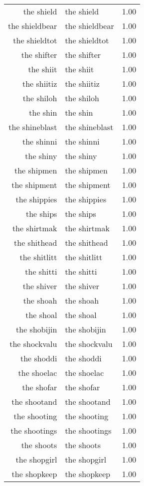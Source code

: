 \begin{table}[ht]
\begin{tabular}{rlr}
  the shield & the shield & 1.00 \\ 
  the shieldbear & the shieldbear & 1.00 \\ 
  the shieldtot & the shieldtot & 1.00 \\ 
  the shifter & the shifter & 1.00 \\ 
  the shiit & the shiit & 1.00 \\ 
  the shiitiz & the shiitiz & 1.00 \\ 
  the shiloh & the shiloh & 1.00 \\ 
  the shin & the shin & 1.00 \\ 
  the shineblast & the shineblast & 1.00 \\ 
  the shinni & the shinni & 1.00 \\ 
  the shiny & the shiny & 1.00 \\ 
  the shipmen & the shipmen & 1.00 \\ 
  the shipment & the shipment & 1.00 \\ 
  the shippies & the shippies & 1.00 \\ 
  the ships & the ships & 1.00 \\ 
  the shirtmak & the shirtmak & 1.00 \\ 
  the shithead & the shithead & 1.00 \\ 
  the shitlitt & the shitlitt & 1.00 \\ 
  the shitti & the shitti & 1.00 \\ 
  the shiver & the shiver & 1.00 \\ 
  the shoah & the shoah & 1.00 \\ 
  the shoal & the shoal & 1.00 \\ 
  the shobijin & the shobijin & 1.00 \\ 
  the shockvalu & the shockvalu & 1.00 \\ 
  the shoddi & the shoddi & 1.00 \\ 
  the shoelac & the shoelac & 1.00 \\ 
  the shofar & the shofar & 1.00 \\ 
  the shootand & the shootand & 1.00 \\ 
  the shooting & the shooting & 1.00 \\ 
  the shootings & the shootings & 1.00 \\ 
  the shoots & the shoots & 1.00 \\ 
  the shopgirl & the shopgirl & 1.00 \\ 
  the shopkeep & the shopkeep & 1.00 \\ 

\end{tabular}
\end{table}
